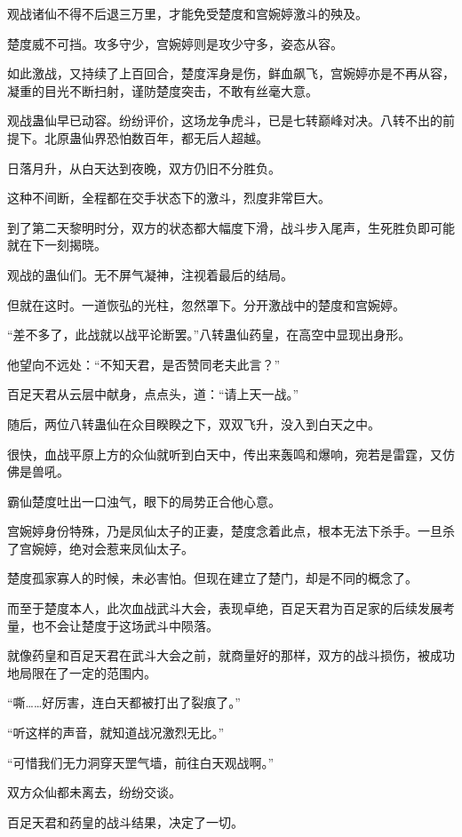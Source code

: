 \begin{this_body}
观战诸仙不得不后退三万里，才能免受楚度和宫婉婷激斗的殃及。

楚度威不可挡。攻多守少，宫婉婷则是攻少守多，姿态从容。

如此激战，又持续了上百回合，楚度浑身是伤，鲜血飙飞，宫婉婷亦是不再从容，凝重的目光不断扫射，谨防楚度突击，不敢有丝毫大意。

观战蛊仙早已动容。纷纷评价，这场龙争虎斗，已是七转巅峰对决。八转不出的前提下。北原蛊仙界恐怕数百年，都无后人超越。

日落月升，从白天达到夜晚，双方仍旧不分胜负。

这种不间断，全程都在交手状态下的激斗，烈度非常巨大。

到了第二天黎明时分，双方的状态都大幅度下滑，战斗步入尾声，生死胜负即可能就在下一刻揭晓。

观战的蛊仙们。无不屏气凝神，注视着最后的结局。

但就在这时。一道恢弘的光柱，忽然罩下。分开激战中的楚度和宫婉婷。

“差不多了，此战就以战平论断罢。”八转蛊仙药皇，在高空中显现出身形。

他望向不远处：“不知天君，是否赞同老夫此言？”

百足天君从云层中献身，点点头，道：“请上天一战。”

随后，两位八转蛊仙在众目睽睽之下，双双飞升，没入到白天之中。

很快，血战平原上方的众仙就听到白天中，传出来轰鸣和爆响，宛若是雷霆，又仿佛是兽吼。

霸仙楚度吐出一口浊气，眼下的局势正合他心意。

宫婉婷身份特殊，乃是凤仙太子的正妻，楚度念着此点，根本无法下杀手。一旦杀了宫婉婷，绝对会惹来凤仙太子。

楚度孤家寡人的时候，未必害怕。但现在建立了楚门，却是不同的概念了。

而至于楚度本人，此次血战武斗大会，表现卓绝，百足天君为百足家的后续发展考量，也不会让楚度于这场武斗中陨落。

就像药皇和百足天君在武斗大会之前，就商量好的那样，双方的战斗损伤，被成功地局限在了一定的范围内。

“嘶……好厉害，连白天都被打出了裂痕了。”

“听这样的声音，就知道战况激烈无比。”

“可惜我们无力洞穿天罡气墙，前往白天观战啊。”

双方众仙都未离去，纷纷交谈。

百足天君和药皇的战斗结果，决定了一切。


\end{this_body}
